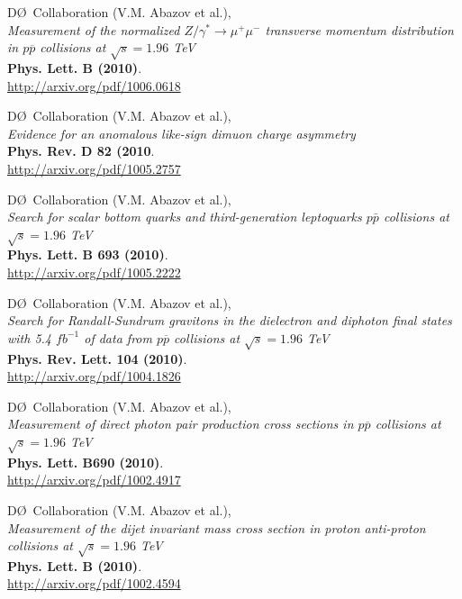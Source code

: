 \documentclass[12pt]{article}
\begin{document}
%
D\O~Collaboration (V.M. Abazov et al.), \\
\textsl{Measurement of the normalized $Z/\gamma^{*}\rightarrow \mu^+\mu^-$ transverse momentum distribution in $p\overline{p}$ collisions at $\sqrt{s}=1.96$ TeV}\\
\textbf{Phys. Lett. B (2010)}.\\
{\small{\url{http://arxiv.org/pdf/1006.0618}}}\vspace{4mm}

%
D\O~Collaboration (V.M. Abazov et al.), \\
\textsl{Evidence for an anomalous like-sign dimuon charge asymmetry}\\
\textbf{Phys. Rev. D 82 (2010}.\\
{\small{\url{http://arxiv.org/pdf/1005.2757}}}\vspace{4mm}

%
D\O~Collaboration (V.M. Abazov et al.), \\
\textsl{Search for scalar bottom quarks and third-generation leptoquarks $p\bar{p}$ collisions at $\sqrt{s}=1.96$ TeV}\\
\textbf{Phys. Lett. B 693 (2010)}.\\
{\small{\url{http://arxiv.org/pdf/1005.2222}}}\vspace{4mm}


%
D\O~Collaboration (V.M. Abazov et al.), \\
\textsl{Search for Randall-Sundrum gravitons in the dielectron and diphoton final states with 5.4 $fb^{-1}$ of data from $p\overline{p}$ collisions at $\sqrt{s}=1.96$ TeV}\\
\textbf{Phys. Rev. Lett. 104 (2010)}.\\
{\small{\url{http://arxiv.org/pdf/1004.1826}}}\vspace{4mm}

%
D\O~Collaboration (V.M. Abazov et al.), \\
\textsl{Measurement of direct photon pair production cross sections in $p\overline{p}$ collisions at $\sqrt{s}=1.96$ TeV}\\
\textbf{Phys. Lett. B690 (2010)}.\\
{\small{\url{http://arxiv.org/pdf/1002.4917}}}\vspace{4mm}

%
D\O~Collaboration (V.M. Abazov et al.), \\
\textsl{Measurement of the dijet invariant mass cross section in proton anti-proton collisions at $\sqrt{s}=1.96$ TeV}\\
\textbf{Phys. Lett. B (2010)}.\\
{\small{\url{http://arxiv.org/pdf/1002.4594}}}\vspace{4mm}
\end{document}
